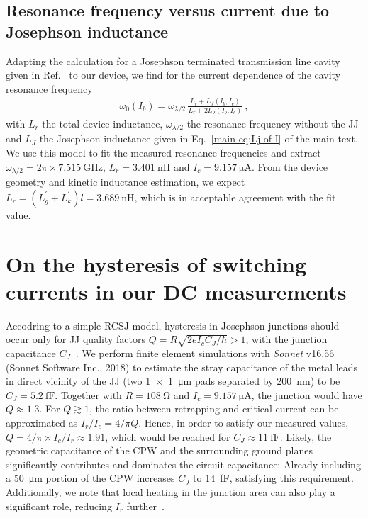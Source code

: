 \subsection{Resonance frequency versus current due to Josephson inductance}\label{sec:resfit}

% 
Adapting the calculation for a Josephson terminated transmission line cavity given in Ref.~\cite{pogorzalekHystereticFluxResponse2017} to our device, we find for the current dependence of the cavity resonance frequency
% 
\begin{align}
\omega_0(I_b)=\omega_{\lambda/2}\,\frac{L_r+L_J(I_b,I_c)}{L_r + 2L_J(I_b,I_c)}\ ,
\end{align}
% 
with $L_r$ the total device inductance, $\omega_{\lambda/2}$ the resonance frequency without the JJ and $L_J$ the Josephson inductance given in Eq.~\eqref{main-eq:Lj-of-I} of the main text.
% 
We use this model to fit the measured resonance frequencies and extract $\omega_{\lambda/2}=2\pi\times\SI{7.515}{\giga\hertz}$, $L_r=\SI{3.401}{\nano\henry}$ and $I_c=\SI{9.157}{\micro\ampere}$.
% 
From the device geometry and kinetic inductance estimation, we expect $L_r=(L_g^\prime+L_k^\prime)l=\SI{3.689}{\nano\henry}$, which is in acceptable agreement with the fit value.

\section{On the hysteresis of switching currents in our DC measurements}\label{sec:hysteresis}
% 
Accodring to a simple RCSJ model, hysteresis in Josephson junctions should occur only for JJ quality factors $Q=R\sqrt{2eI_c C_J/\hbar} > 1$, with the junction capacitance $C_J$~\cite{tinkhamIntroductionSuperconductivity1996}.
% 
We perform finite element simulations with \textit{Sonnet} v16.56 (Sonnet Software Inc., 2018) to estimate the stray capacitance of the metal leads in direct vicinity of the JJ (two \SI{1x1}{\micro\meter} pads separated by \SI{200}{\nano\meter}) to be $C_J=\SI{5.2}{\femto\farad}$.
% 
Together with $R=\SI{108}{\ohm}$ and $I_c=\SI{9.157}{\micro\ampere}$, the junction would have $Q\approx1.3$.
% 
For $Q \gtrsim 1$, the ratio between retrapping and critical current can be approximated as $I_r/I_c=4/\pi Q$.
% 
Hence, in order to satisfy our measured values, $Q=4/\pi\times I_c/ I_r\approx1.91$, which would be reached for $C_J\approx\SI{11}{\femto\farad}$.
% 
Likely, the geometric capacitance of the CPW and the surrounding ground planes significantly contributes and dominates the circuit capacitance:
% 
Already including a \SI{50}{\micro\meter} portion of the CPW increases $C_J$ to \SI{14}{\femto\farad}, satisfying this requirement.
% 
Additionally, we note that local heating in the junction area can also play a significant role, reducing $I_r$ further~\cite{skocpolSelfHeatingHotspots1974,hazraHysteresisSuperconductingShort2010,kumarReversibilitySuperconductingNb2015}.

